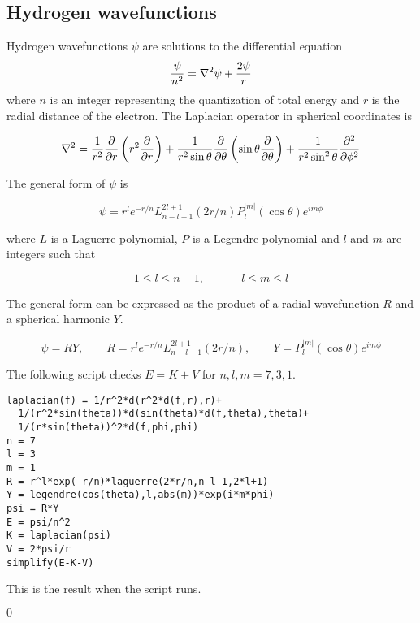 
\subsection{Hydrogen wavefunctions}
Hydrogen wavefunctions $\psi$ are solutions to the differential equation
$${\psi\over n^2}=\nabla^2\psi+{2\psi\over r}$$
where $n$ is an integer representing the quantization of total energy and
$r$ is the radial distance of the electron.
The Laplacian operator in spherical coordinates is

$$\nabla^2={1\over r^2}{\partial\over\partial r}
\left(r^2{\partial\over\partial r}\right)
+{1\over r^2\sin\theta}{\partial\over\partial\theta}
\left(\sin\theta{\partial\over\partial\theta}\right)
+{1\over r^2\sin^2\theta}{\partial^2\over\partial\phi^2}$$

The general form of $\psi$ is

$$\psi=r^le^{-r/n}L_{n-l-1}^{2l+1}(2r/n)
P_l^{|m|}(\cos\theta)e^{im\phi}$$

where $L$ is a Laguerre polynomial, $P$ is a Legendre polynomial and
$l$ and $m$ are integers such that

$$1\le l\le n-1,\qquad -l\le m\le l$$

The general form can be expressed as the product of a radial
wavefunction $R$ and a spherical harmonic $Y$.

$$\psi=RY,\qquad R=r^le^{-r/n}L_{n-l-1}^{2l+1}(2r/n),\qquad
Y=P_l^{|m|}(\cos\theta)e^{im\phi}$$

The following script checks $E=K+V$ for $n,l,m=7,3,1$.

\begin{Verbatim}[formatcom=\color{blue},samepage=true]
laplacian(f) = 1/r^2*d(r^2*d(f,r),r)+
  1/(r^2*sin(theta))*d(sin(theta)*d(f,theta),theta)+
  1/(r*sin(theta))^2*d(f,phi,phi)
n = 7
l = 3
m = 1
R = r^l*exp(-r/n)*laguerre(2*r/n,n-l-1,2*l+1)
Y = legendre(cos(theta),l,abs(m))*exp(i*m*phi)
psi = R*Y
E = psi/n^2
K = laplacian(psi)
V = 2*psi/r
simplify(E-K-V)
\end{Verbatim}

This is the result when the script runs.

$\displaystyle 0$
